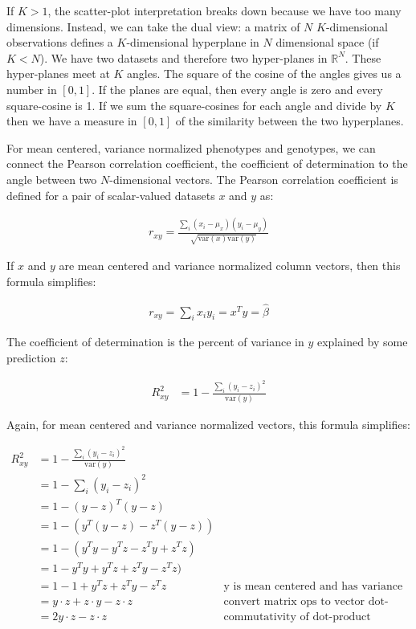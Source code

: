 \documentclass{article}
\newcommand{\R}{\mathbb{R}}
\begin{document}
If $K > 1$, the scatter-plot interpretation breaks down because we have too many
dimensions. Instead, we can take the dual view: a matrix of $N$ $K$-dimensional observations defines
a $K$-dimensional hyperplane in $N$ dimensional space (if $K < N$). We have two datasets and
therefore two hyper-planes in $\R^N$. These hyper-planes meet at $K$ angles. The square of the
cosine of the angles gives us a number in $[0, 1]$. If the planes are equal, then every angle is
zero and every square-cosine is 1. If we sum the square-cosines for each angle and divide by $K$
then we have a measure in $[0, 1]$ of the similarity between the two hyperplanes.

For mean centered, variance normalized phenotypes and genotypes, we can connect the Pearson
correlation coefficient, the coefficient of determination to the angle between two $N$-dimensional
vectors. The Pearson correlation coefficient is defined for a pair of scalar-valued datasets $x$ and
$y$ as:

\begin{align*}
r_{xy} = \frac{\sum_i (x_i - \mu_x) (y_i - \mu_y)}{\sqrt{\text{var}(x)\text{var}(y)}}
\end{align*}

If $x$ and $y$ are mean centered and variance normalized column vectors, then this formula
simplifies:

\begin{align*}
r_{xy} = \sum_i x_i y_i = x^T y = \widehat{\beta}
\end{align*}

The coefficient of determination is the percent of variance in $y$ explained by some prediction $z$:

\begin{align*}
R^2_{xy} &= 1 - \frac{\sum_i (y_i - z_i)^2}{\text{var}(y)}
\end{align*}

Again, for mean centered and variance normalized vectors, this formula simplifies:

\begin{align*}
R^2_{xy} &= 1 - \frac{\sum_i (y_i - z_i)^2}{\text{var}(y)} \\
         &= 1 - \sum_i (y_i - z_i)^2 \\
         &= 1 - (y - z)^T(y - z) \\
         &= 1 - (y^T(y - z) - z^T(y - z)) \\
         &= 1 - (y^Ty - y^Tz - z^Ty + z^Tz) \\
         &= 1 - y^Ty + y^Tz + z^Ty - z^Tz) \\
         &= 1 - 1 + y^Tz + z^Ty - z^Tz & \text{y is mean centered and has variance one}\\
         &= y\cdot z + z\cdot y - z\cdot z & \text{convert matrix ops to vector dot-products}\\
         &= 2 y\cdot z - z \cdot z & \text{commutativity of dot-product}
\end{align*}
\end{document}
